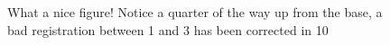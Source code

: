\begin{figure}
    \caption{What a nice figure! Notice a quarter of the way up from the base, a bad registration between 1 and 3 has been corrected in 10}
    \label{fig:dummy_cross_sections}
  \end{figure}
  
